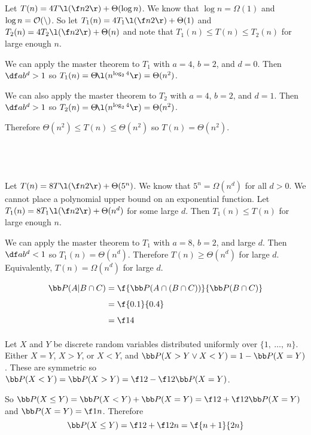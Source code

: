 \documentclass[a4paper]{article}
\begin{document}

\subsection{~}

Let $T(n) = 4T\l(\f n2\r) + \Theta(\log n)$. We know that $\log n = \Omega(1)$ and $\log n = \cal O(n)$. So let $T_1(n) = 4T_1\l(\f n2\r) + \Theta(1)$ and $T_2(n) = 4T_2\l(\f n2\r) + \Theta(n)$ and note that $T_1(n) \le T(n) \le T_2(n)$ for large enough $n$.

We can apply the master theorem to $T_1$ with $a=4$, $b=2$, and $d=0$. Then $\df a{b^d} > 1$ so $T_1(n) = \Theta\!\l(n^{\log_2 4}\r) = \Theta(n^2)$.

We can also apply the master theorem to $T_2$ with $a=4$, $b=2$, and $d=1$. Then $\df a{b^d} > 1$ so $T_2(n) = \Theta\!\l(n^{\log_2 4}\r) = \Theta(n^2)$.

Therefore $\Theta(n^2) \le T(n) \le \Theta(n^2)$ so $T(n) = \Theta(n^2)$.

\subsection{~}

Let $T(n) = 8T\l(\f n2\r) + \Theta(5^n)$. We know that $5^n = \Omega(n^d)$ for all $d > 0$. We cannot place a polynomial upper bound on an exponential function. Let $T_1(n) = 8T_1\l(\f n2\r) + \Theta(n^d)$ for some large $d$. Then $T_1(n) \le T(n)$ for large enough $n$.

We can apply the master theorem to $T_1$ with $a=8$, $b=2$, and large $d$. Then $\df a{b^d} < 1$ so $T_1(n) = \Theta(n^d)$. Therefore $T(n) \ge \Theta(n^d)$ for large $d$. Equivalently, $T(n) = \Omega(n^d)$ for large $d$.


\begin{align*}
\bb P(A | B \cap C) &= \f{\bb P(A \cap (B \cap C))}{\bb P(B \cap C)}\\[1ex]
&= \f{0.1}{0.4}\\[1ex]
&= \f14\\[1ex]
\end{align*}


Let $X$ and $Y$ be discrete random variables distributed uniformly over $\{1,\ \ldots,\ n\}$. Either $X = Y$, $X > Y$, or $X < Y$, and $\bb P(X > Y \lor X < Y) = 1 - \bb P(X = Y)$. These are symmetric so $\bb P(X < Y) = \bb P(X > Y) = \f12 - \f12 \bb P(X = Y)$.

So $\bb P(X \le Y) = \bb P(X < Y) + \bb P(X = Y) = \f12  + \f12 \bb P(X = Y)$ and $\bb P(X = Y) = \f1n$. Therefore $$\bb P(X \le Y) = \f12 + \f1{2n} = \f{n + 1}{2n}$$


\end{document}
